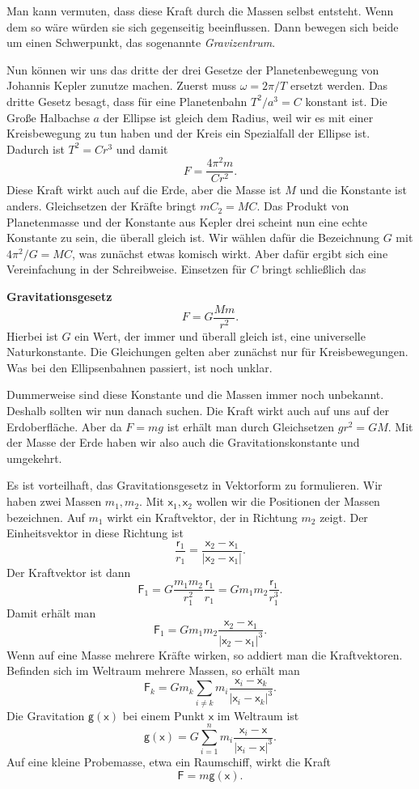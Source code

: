 \documentclass[a4paper,11pt,fleqn,twocolumn,twoside,dvipdfmx]{scrartcl}
\newcommand{\bvec}[1]{\bm{\mathsf{#1}}}
\begin{document}
Man kann vermuten, dass diese Kraft durch die Massen selbst entsteht.
Wenn dem so wäre würden sie sich gegenseitig beeinflussen. Dann
bewegen sich beide um einen Schwerpunkt,
das sogenannte \textit{Gravizentrum}.

Nun können wir uns das dritte der drei Gesetze der Planetenbewegung
von Johannis Kepler zunutze machen. Zuerst muss $\omega=2\pi/T$
ersetzt werden. Das dritte Gesetz besagt, dass für eine
Planetenbahn $T^2/a^3=C$ konstant ist. Die Große Halbachse
$a$ der Ellipse ist gleich dem Radius, weil wir es mit einer
Kreisbewegung zu tun haben und der Kreis ein Spezialfall der
Ellipse ist. Dadurch ist $T^2=Cr^3$ und damit%
\[F = \frac{4\pi^2 m}{Cr^2}.\]
Diese Kraft wirkt auch auf die Erde, aber die Masse ist $M$
und die Konstante ist anders. Gleichsetzen der Kräfte
bringt $mC_2=MC$. Das Produkt von Planetenmasse und der Konstante
aus Kepler drei scheint nun eine echte Konstante zu sein, die überall
gleich ist. Wir wählen dafür
die Bezeichnung $G$ mit $4\pi^2/G=MC$, was zunächst etwas komisch
wirkt. Aber dafür ergibt sich eine Vereinfachung in der Schreibweise.
Einsetzen für $C$ bringt schließlich das

\textbf{Gravitationsgesetz}
\[F = G \frac{Mm}{r^2}.\]
Hierbei ist $G$ ein Wert, der immer und überall gleich ist, eine
universelle Naturkonstante. Die Gleichungen gelten aber zunächst
nur für Kreisbewegungen. Was bei den Ellipsenbahnen passiert,
ist noch unklar.

Dummerweise sind diese Konstante und die Massen immer noch unbekannt.
Deshalb sollten wir nun danach suchen. Die Kraft wirkt auch auf
uns auf der Erdoberfläche. Aber da $F=mg$ ist erhält man durch
Gleichsetzen $gr^2=GM$. Mit der Masse der Erde haben wir also auch
die Gravitationskonstante und umgekehrt.

Es ist vorteilhaft, das Gravitationsgesetz in Vektorform zu
formulieren. Wir haben zwei Massen $m_1, m_2$.
Mit $\bvec x_1, \bvec x_2$ wollen wir die Positionen
der Massen bezeichnen. Auf $m_1$ wirkt ein Kraftvektor, der in
Richtung $m_2$ zeigt. Der Einheitsvektor in diese Richtung ist%
\[\frac{\bvec r_1}{r_1} = \frac{\bvec x_2-\bvec x_1}
{|\bvec x_2-\bvec x_1|}.\]
Der Kraftvektor ist dann
\[\bvec F_1 = G \frac{m_1m_2}{r_1^2}\frac{\bvec r_1}{r_1}
= Gm_1m_2\frac{\bvec r_1}{r_1^3}.\]
Damit erhält man
\[\bvec F_1 = Gm_1m_2\frac{\bvec x_2-\bvec x_1}
{|\bvec x_2-\bvec x_1|^3}.\]
Wenn auf eine Masse mehrere Kräfte wirken, so addiert man die
Kraftvektoren. Befinden sich im Weltraum mehrere Massen,
so erhält man%
\[\bvec F_k = Gm_k\sum_{i\ne k}m_i\frac{\bvec x_i-\bvec x_k}
{|\bvec x_i-\bvec x_k|^3}.\]
Die Gravitation $\bvec g(\bvec x)$ bei einem
Punkt $\bvec x$ im Weltraum ist%
\[\bvec g(\bvec x)
= G\sum_{i=1}^n m_i\frac{\bvec x_i-\bvec x}
{|\bvec x_i-\bvec x|^3}.\]
Auf eine kleine Probemasse, etwa ein Raumschiff, wirkt die Kraft%
\[\bvec F = m\bvec g(\bvec x).\]
\end{document}
